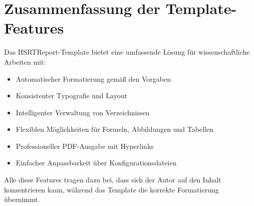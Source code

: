 \section{Zusammenfassung der Template-Features}
\label{sec:template_zusammenfassung}

Das HSRTReport-Template bietet eine umfassende Lösung für wissenschaftliche Arbeiten mit:
\begin{itemize}
	\item Automatischer Formatierung gemäß den Vorgaben
	\item Konsistenter Typografie und Layout
	\item Intelligenter Verwaltung von Verzeichnissen
	\item Flexiblen Möglichkeiten für Formeln, Abbildungen und Tabellen
	\item Professioneller PDF-Ausgabe mit Hyperlinks
	\item Einfacher Anpassbarkeit über Konfigurationsdateien
\end{itemize}

Alle diese Features tragen dazu bei, dass sich der Autor auf den Inhalt konzentrieren kann, während das Template die korrekte Formatierung übernimmt.

